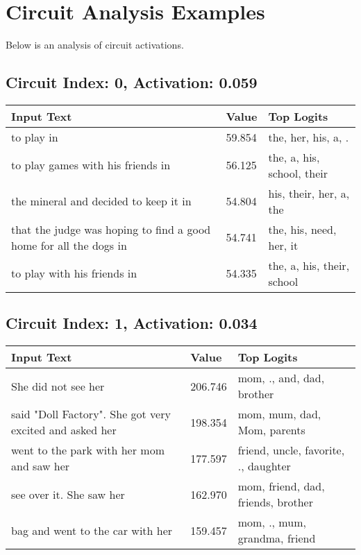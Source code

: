 \documentclass{article}
\begin{document}
\section*{Circuit Analysis Examples}

\noindent Below is an analysis of circuit activations.

\subsection*{Circuit Index: 0, Activation: 0.059}

\begin{longtable}{p{} p{} p{}}
\toprule
\textbf{Input Text} & \textbf{Value} & \textbf{Top Logits} \\
\midrule
to play in & 59.854 & the, her, his, a, . \\
to play games with his friends in & 56.125 & the, a, his, school, their \\
the mineral and decided to keep it in & 54.804 & his, their, her, a, the \\
that the judge was hoping to find a good home for all the dogs in & 54.741 & the, his, need, her, it \\
to play with his friends in & 54.335 & the, a, his, their, school \\

\bottomrule
\end{longtable}
\subsection*{Circuit Index: 1, Activation: 0.034}

\begin{longtable}{p{} p{} p{}}
\toprule
\textbf{Input Text} & \textbf{Value} & \textbf{Top Logits} \\
\midrule
She did not see her & 206.746 & mom, ., and, dad, brother \\
said "Doll Factory". She got very excited and asked her & 198.354 & mom, mum, dad, Mom, parents \\
went to the park with her mom and saw her & 177.597 & friend, uncle, favorite, ., daughter \\
see over it. She saw her & 162.970 & mom, friend, dad, friends, brother \\
bag and went to the car with her & 159.457 & mom, ., mum, grandma, friend \\

\bottomrule
\end{longtable}
\end{document}
